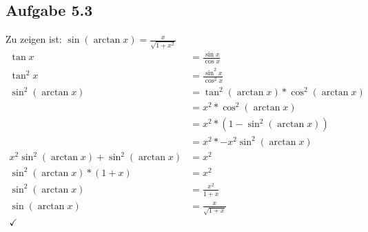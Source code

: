 \documentclass{standalone}
\begin{document}
\subsection{Aufgabe 5.3}
Zu zeigen ist: $\sin(\arctan x) = \frac{x}{\sqrt{1+x^2}} $ \\
\begin{align*}
	\tan x &= \frac{\sin x}{\cos x} \\
	\tan^2 x &= \frac{\sin^2x}{\cos^2 x} \\
	\sin^2(\arctan x) &= \tan^2 (\arctan x) * \cos^2 (\arctan x) \\
	&= x^2 * \cos^2 (\arctan x) \\
	&= x^2 * (1 - \sin^2 (\arctan x))\\
	&= x^2 * - x^2 \sin^2 (\arctan x) \\
	x^2 \sin^2 (\arctan x) + \sin^2 (\arctan x) &= x^2 \\
	\sin^2(\arctan x) * (1+x) &= x^2 \\
	\sin^2 (\arctan x) &= \frac{x^2}{1+x} \\
	\sin (\arctan x) &= \frac{x}{\sqrt{1+x}}\\
	\checkmark
\end{align*}
\end{document}
